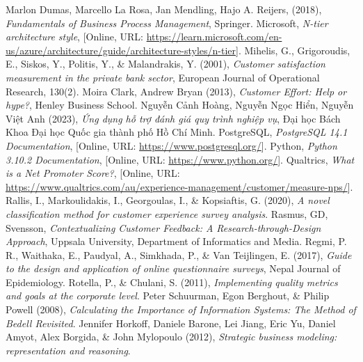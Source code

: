\begin{thebibliography}{9}
     Marlon Dumas, Marcello La Rosa, Jan Mendling, Hajo A. Reijers, (2018), \textit{Fundamentals of Business Process Management}, Springer.
     Microsoft, \textit{N-tier architecture style}, [Online, URL: \url{https://learn.microsoft.com/en-us/azure/architecture/guide/architecture-styles/n-tier}].
     Mihelis, G., Grigoroudis, E., Siskos, Y., Politis, Y., \& Malandrakis, Y. (2001), \textit{Customer satisfaction measurement in the private bank sector}, European Journal of Operational Research, 130(2).
     Moira Clark, Andrew Bryan (2013), \textit{Customer Effort: Help or hype?}, Henley Business School.
     Nguyễn Cảnh Hoàng, Nguyễn Ngọc Hiển, Nguyễn Việt Anh (2023), \textit{Ứng dụng hỗ trợ đánh giá quy trình nghiệp vụ}, Đại học Bách Khoa Đại học Quốc gia thành phố Hồ Chí Minh.
     PostgreSQL, \textit{PostgreSQL 14.1 Documentation}, [Online, URL: \url{https://www.postgresql.org/}].
     Python, \textit{Python 3.10.2 Documentation}, [Online, URL: \url{https://www.python.org/}].
     Qualtrics, \textit{What is a Net Promoter Score?}, [Online, URL: \url{https://www.qualtrics.com/au/experience-management/customer/measure-nps/}].
     Rallis, I., Markoulidakis, I., Georgoulas, I., \& Kopsiaftis, G. (2020), \textit{A novel classification method for customer experience survey analysis}.
     Rasmus, GD, Svensson, \textit{Contextualizing Customer Feedback: A Research-through-Design Approach}, Uppsala University, Department of Informatics and Media.
     Regmi, P. R., Waithaka, E., Paudyal, A., Simkhada, P., \& Van Teijlingen, E. (2017), \textit{Guide to the design and application of online questionnaire surveys}, Nepal Journal of Epidemiology.
     Rotella, P., \& Chulani, S. (2011), \textit{Implementing quality metrics and goals at the corporate level}.
     Peter Schuurman, Egon Berghout, \& Philip Powell (2008), \textit{Calculating the Importance of Information Systems: The Method of Bedell Revisited}.
     Jennifer Horkoff, Daniele Barone, Lei Jiang,
    Eric Yu, Daniel Amyot, Alex Borgida, \& John Mylopoulo (2012), \textit{Strategic business modeling: representation and reasoning}.
\end{thebibliography}
